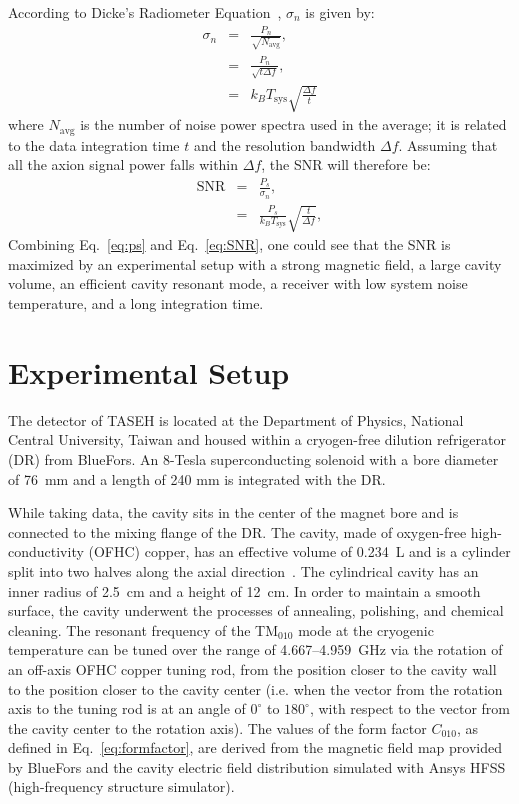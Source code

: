 \documentclass[%
reprint, %
superscriptaddress,
 amsmath,amssymb,
 aps
]{revtex4-2}
\begin{document}
According to Dicke's Radiometer Equation~\cite{Dicke}, $\sigma_n$ 
is given by: 
\begin{eqnarray}
 \sigma_n  &=&  \frac{P_n}{\sqrt{N_\text{avg}}}, \nonumber \\
           &=&  \frac{P_n}{\sqrt{t\Delta f}}, \nonumber \\
           &=&  k_B T_\text{sys}\sqrt{\frac{\Delta f}{t}} 
 \label{eq:sigman}
\end{eqnarray}
where $N_\text{avg}$ is the number of noise power spectra used in the 
average; it is related to the data integration time $t$ 
and the resolution bandwidth $\Delta f$.  
Assuming that all the axion signal power falls within $\Delta f$, 
the SNR will therefore be: 
\begin{eqnarray}
   \text{SNR} & = & \frac{P_s}{\sigma_n}, \nonumber \\
              & = & \frac{P_s}{k_B T_\text{sys}}\sqrt{\frac{t}{\Delta f}},
 \label{eq:SNR}
\end{eqnarray}  
Combining Eq.~\eqref{eq:ps} and Eq.~\eqref{eq:SNR},
one could see that the SNR is maximized by an experimental setup with 
a strong magnetic field, a large cavity volume, an efficient cavity 
resonant mode, a receiver with low system noise temperature, and a 
long integration time. 

\section{Experimental Setup}\label{sec:taseh} 
The detector of TASEH is located at the Department of Physics, National 
Central University, Taiwan and housed within a cryogen-free dilution 
refrigerator (DR) from BlueFors. An 8-Tesla superconducting solenoid 
with a bore diameter of 76~mm and a length of 240 mm is integrated with the 
DR. 

While taking data, the cavity sits in the center of the magnet bore 
and is connected to the mixing flange of the DR. 
The cavity, made of oxygen-free high-conductivity (OFHC) copper, has an 
effective volume of 0.234~L and is a cylinder split into two halves along 
the axial direction~\cite{TASEHInstrumentation}. 
The cylindrical cavity has an inner radius of 2.5~cm and a 
height of 12~cm.  In order to maintain a smooth surface, the cavity underwent 
the processes of annealing, polishing, and chemical cleaning. The resonant 
frequency of the TM$_{010}$ mode at the cryogenic temperature 
can be tuned over the range of 
4.667--4.959~GHz via the rotation of an off-axis OFHC copper tuning rod, from 
the position closer to the cavity wall to the position closer to the cavity 
center (i.e. when the vector from the rotation axis to the tuning rod is 
at an angle of $0^\circ$ to $180^\circ$, with respect to the vector from the 
cavity center to the rotation axis). 
%
The values of the form factor $C_{010}$, as defined in 
Eq.~\eqref{eq:formfactor}, 
 are derived from the magnetic field map provided by 
BlueFors and the cavity electric field distribution simulated with 
 Ansys HFSS (high-frequency structure simulator).  
\end{document}
